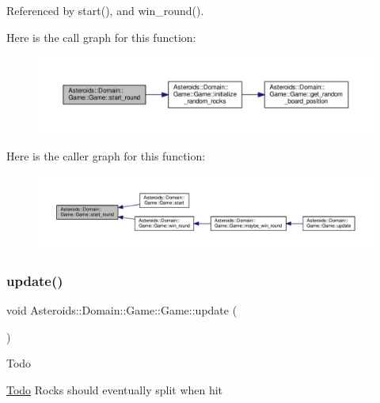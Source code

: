 Referenced by start(), and win\+\_\+round().

Here is the call graph for this function\+:\nopagebreak
\begin{figure}[H]
\begin{center}
\leavevmode
\includegraphics[width=350pt]{classAsteroids_1_1Domain_1_1Game_1_1Game_aa242712e038fce29760d53eb1d57c9fb_cgraph}
\end{center}
\end{figure}
Here is the caller graph for this function\+:\nopagebreak
\begin{figure}[H]
\begin{center}
\leavevmode
\includegraphics[width=350pt]{classAsteroids_1_1Domain_1_1Game_1_1Game_aa242712e038fce29760d53eb1d57c9fb_icgraph}
\end{center}
\end{figure}
\mbox{\label{classAsteroids_1_1Domain_1_1Game_1_1Game_aa63114be578393b0113f116798346ac4}} 
\subsubsection{\texorpdfstring{update()}{update()}}
{\footnotesize\ttfamily void Asteroids\+::\+Domain\+::\+Game\+::\+Game\+::update (\begin{DoxyParamCaption}{ }\end{DoxyParamCaption})\hspace{0.3cm}{\ttfamily [virtual]}}

\begin{DoxyRefDesc}{Todo}
\item[\hyperlink{todo__todo000004}{Todo}]Rocks should eventually split when hit \end{DoxyRefDesc}



